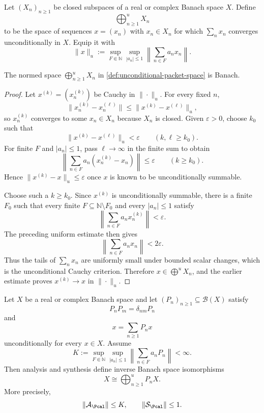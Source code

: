\begin{definition}
\label{def:unconditional-packet-space}
Let $(X_n)_{n\geq1}$ be closed subspaces of a real or complex Banach space $X$.  Define
\[
\bigoplus_{n\geq1}^{u}X_n
\]
to be the space of sequences $x=(x_n)$ with $x_n\in X_n$ for which $\sum_nx_n$ converges unconditionally in $X$.  Equip it with
\[
\|x\|_u
:=
\sup_{F\Subset\mathbb N}
\sup_{|a_n|\leq1}
\left\|\sum_{n\in F}a_nx_n\right\|.
\]
\end{definition}

\begin{lemma}
\label{lem:unconditional-completeness}
The normed space $\bigoplus_{n\geq1}^{u}X_n$ in \cref{def:unconditional-packet-space} is Banach.
\end{lemma}

\begin{proof}
Let $x^{(k)}=(x_n^{(k)})$ be Cauchy in $\|\cdot\|_u$.  For every fixed $n$,
\[
\|x_n^{(k)}-x_n^{(\ell)}\|
\leq
\|x^{(k)}-x^{(\ell)}\|_u,
\]
so $x_n^{(k)}$ converges to some $x_n\in X_n$ because $X_n$ is closed.  Given $\varepsilon>0$, choose $k_0$ such that
\[
\|x^{(k)}-x^{(\ell)}\|_u<\varepsilon
\qquad(k,\ell\geq k_0).
\]
For finite $F$ and $|a_n|\leq1$, pass $\ell\to\infty$ in the finite sum to obtain
\[
\left\|\sum_{n\in F}a_n(x_n^{(k)}-x_n)\right\|
\leq\varepsilon
\qquad(k\geq k_0).
\]
Hence $\|x^{(k)}-x\|_u\leq\varepsilon$ once $x$ is known to be unconditionally summable.

Choose such a $k\geq k_0$.  Since $x^{(k)}$ is unconditionally summable, there is a finite $F_0$ such that every finite $F\subseteq\mathbb N\setminus F_0$ and every $|a_n|\leq1$ satisfy
\[
\left\|\sum_{n\in F}a_nx_n^{(k)}\right\|<\varepsilon.
\]
The preceding uniform estimate then gives
\[
\left\|\sum_{n\in F}a_nx_n\right\|<2\varepsilon.
\]
Thus the tails of $\sum_nx_n$ are uniformly small under bounded scalar changes, which is the unconditional Cauchy criterion.  Therefore $x\in\bigoplus^uX_n$, and the earlier estimate proves $x^{(k)}\to x$ in $\|\cdot\|_u$.
\end{proof}

\begin{theorem}
\label{thm:countable-packets}
Let $X$ be a real or complex Banach space and let $(P_n)_{n\geq1}\subseteq\mathcal B(X)$ satisfy
\[
P_nP_m=\delta_{nm}P_n
\]
and
\[
x=\sum_{n\geq1}P_nx
\]
unconditionally for every $x\in X$.  Assume
\[
K:=
\sup_{F\Subset\mathbb N}
\sup_{|a_n|\leq1}
\left\|\sum_{n\in F}a_nP_n\right\|<\infty.
\]
Then analysis and synthesis define inverse Banach space isomorphisms
\[
\boxed{
X\cong\bigoplus_{n\geq1}^{u}P_nX.
}
\]
More precisely,
\[
\|\mathcal A_{\Pcal}\|\leq K,
\qquad
\|\mathcal S_{\Pcal}\|\leq1.
\]
\end{theorem}

